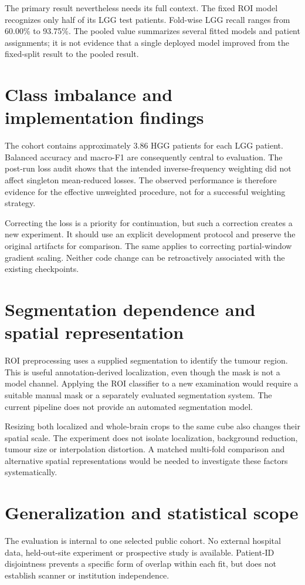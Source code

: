 \documentclass[12pt,a4paper,oneside]{report}
\begin{document}
The primary result nevertheless needs its full context. The fixed ROI model recognizes only half of its LGG test patients. Fold-wise LGG recall ranges from 60.00\% to 93.75\%. The pooled value summarizes several fitted models and patient assignments; it is not evidence that a single deployed model improved from the fixed-split result to the pooled result.

\section{Class imbalance and implementation findings}
The cohort contains approximately 3.86 HGG patients for each LGG patient. Balanced accuracy and macro-F1 are consequently central to evaluation. The post-run loss audit shows that the intended inverse-frequency weighting did not affect singleton mean-reduced losses. The observed performance is therefore evidence for the effective unweighted procedure, not for a successful weighting strategy.

Correcting the loss is a priority for continuation, but such a correction creates a new experiment. It should use an explicit development protocol and preserve the original artifacts for comparison. The same applies to correcting partial-window gradient scaling. Neither code change can be retroactively associated with the existing checkpoints.

\section{Segmentation dependence and spatial representation}
ROI preprocessing uses a supplied segmentation to identify the tumour region. This is useful annotation-derived localization, even though the mask is not a model channel. Applying the ROI classifier to a new examination would require a suitable manual mask or a separately evaluated segmentation system. The current pipeline does not provide an automated segmentation model.

Resizing both localized and whole-brain crops to the same cube also changes their spatial scale. The experiment does not isolate localization, background reduction, tumour size or interpolation distortion. A matched multi-fold comparison and alternative spatial representations would be needed to investigate these factors systematically.

\section{Generalization and statistical scope}
The evaluation is internal to one selected public cohort. No external hospital data, held-out-site experiment or prospective study is available. Patient-ID disjointness prevents a specific form of overlap within each fit, but does not establish scanner or institution independence.
\end{document}
